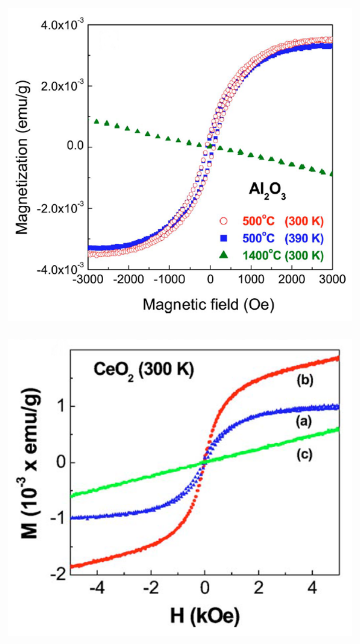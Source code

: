 \documentclass[main.tex]{subfiles}
\begin{document}
\begin{figure}[!htb]
\centering
	\begin{subfigure}[h]{0.45\textwidth}
		\centering
		\includegraphics[width=\linewidth]{sunderasan_al2o3}
  		\caption{}
	\end{subfigure}
	\begin{subfigure}[h]{0.46\textwidth}
		\centering
		\includegraphics[width=\linewidth]{sunderasan_ceo2}

\end{subfigure}
\end{figure}
\end{document}
